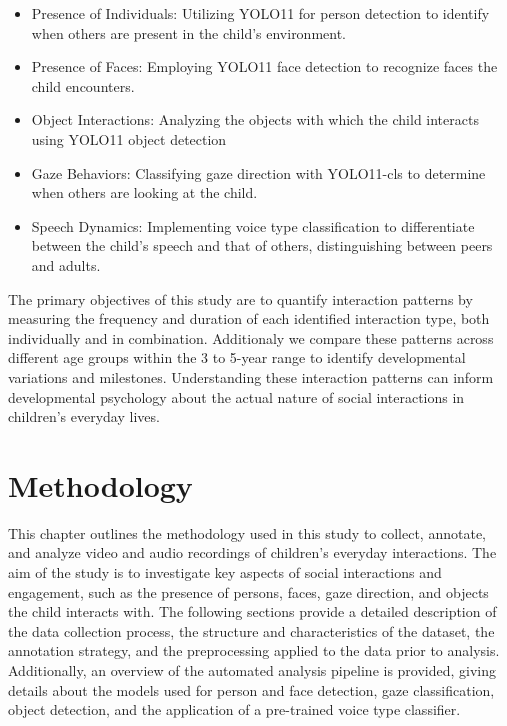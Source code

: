 \documentclass[
  man,floatsintext]{apa6}
\providecommand{\tightlist}{%
  \setlength{\itemsep}{0pt}\setlength{\parskip}{0pt}}
\begin{document}
\begin{itemize}
\tightlist
\item
  Presence of Individuals: Utilizing YOLO11 for person detection to identify when others are present in the child's environment.
\item
  Presence of Faces: Employing YOLO11 face detection to recognize faces the child encounters.
\item
  Object Interactions: Analyzing the objects with which the child interacts using YOLO11 object detection
\item
  Gaze Behaviors: Classifying gaze direction with YOLO11-cls to determine when others are looking at the child.
\item
  Speech Dynamics: Implementing voice type classification to differentiate between the child's speech and that of others, distinguishing between peers and adults.
\end{itemize}

The primary objectives of this study are to quantify interaction patterns by measuring the frequency and duration of each identified interaction type, both individually and in combination. Additionaly we compare these patterns across different age groups within the 3 to 5-year range to identify developmental variations and milestones. Understanding these interaction patterns can inform developmental psychology about the actual nature of social interactions in children's everyday lives.

\section{Methodology}\label{methodology}

This chapter outlines the methodology used in this study to collect, annotate, and analyze video and audio recordings of children's everyday interactions. The aim of the study is to investigate key aspects of social interactions and engagement, such as the presence of persons, faces, gaze direction, and objects the child interacts with. The following sections provide a detailed description of the data collection process, the structure and characteristics of the dataset, the annotation strategy, and the preprocessing applied to the data prior to analysis. Additionally, an overview of the automated analysis pipeline is provided, giving details about the models used for person and face detection, gaze classification, object detection, and the application of a pre-trained voice type classifier.
\end{document}
